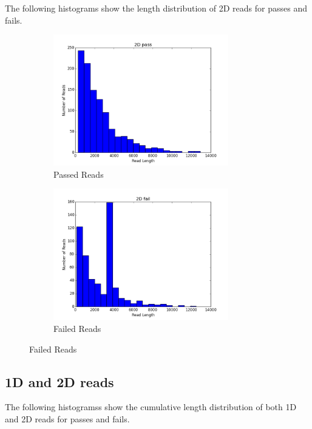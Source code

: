 \documentclass[11pt]{article}
\begin{document}
        The following histograms show the length distribution of 2D reads for passes and fails.

        \begin{figure}[h!]
		\begin{subfigure}[b]{0.45\textwidth}
    			\includegraphics[width=3in]{2Dpasses}
    			\caption{Passed Reads}
  		\end{subfigure}
  		\begin{subfigure}[b]{0.45\textwidth}
    			\includegraphics[width=3in]{2Dfailures}
    			\caption{Failed Reads}
  		\end{subfigure}
	\end{figure}

        
\subsection*{1D and 2D reads}

        The following histogramss show the cumulative length distribution of both 1D and 2D reads for passes and fails.
\end{document}
